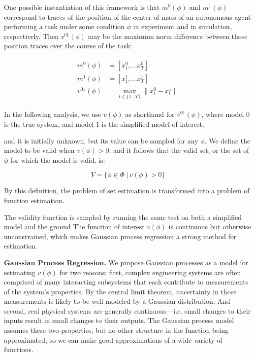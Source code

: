 \documentclass[letterpaper, 10 pt, conference]{ieeeconf}
\begin{document}
One possible instantiation of this framework is that $m^0(\phi)$ and $m^1(\phi)$ correspond to traces of the position of the center of mass of an autonomous agent performing a task under some condition $\phi$ in experiment and in simulation, respectively. Then $v^{01}(\phi)$ may be the maximum norm difference between those position traces over the course of the task:

\begin{align}
\begin{split}
    m^0(\phi)&=[x^0_1,...x^0_T] \\
    m^1(\phi)&=[x^1_1,...x^1_T] \\
    v^{01}(\phi) &= \max\limits_{t\in\{1...T\}} \|x^0_t-x^1_t\|
\end{split}
\end{align}
\smallskip

In the following analysis, we use $v(\phi)$ as shorthand for $v^{01}(\phi)$, where model $0$ is the true system, and model $1$ is the simplified model of interest.

and it is initially unknown, but its value can be sampled for any $\phi$. We define the model to be valid when $v(\phi)>0$, and it follows that the valid set, or the set of $\phi$ for which the model is valid, is:

\begin{equation}
    V=\{\phi\in\Phi\ |\ v(\phi)>0\}
\end{equation}

By this definition, the problem of set estimation is transformed into a problem of function estimation.

The validity function is sampled by running the same test on both a simplified model and the ground The function of interest $v(\phi)$ is continuous but otherwise unconstrained, which makes Gaussian process regression a strong method for estimation. 
\linebreak

\noindent\textbf{Gaussian Process Regression.} We propose Gaussian processes as a model for estimating $v(\phi)$ for two reasons: first, complex engineering systems are often comprised of many interacting subsystems that each contribute to measurements of the system's properties. By the central limit theorem, uncertainty in those measurements is likely to be well-modeled by a Gaussian distribution. And second, real physical systems are generally continuous---i.e. small changes to their inputs result in small changes to their outputs. The Gaussian process model assumes these two properties, but no other structure in the function being approximated, so we can make good approximations of a wide variety of functions.
\end{document}
